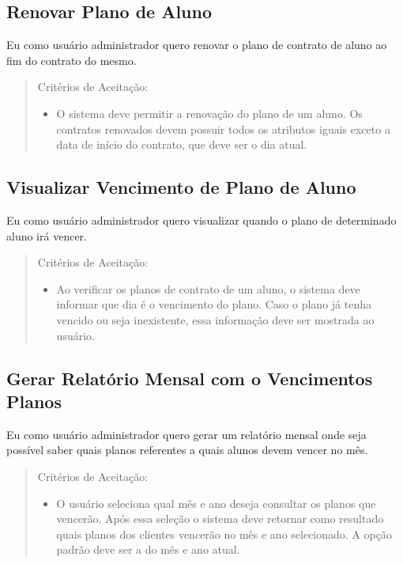 \subsection[Renovar Plano de Aluno]{Renovar Plano de Aluno}
Eu como usuário administrador quero renovar o plano de contrato de aluno ao fim do contrato do mesmo.

\begin{quote}
Critérios de Aceitação:
    \begin{itemize}
        \item O sistema deve permitir a renovação do plano de um aluno.  Os contratos renovados devem possuir todos os atributos iguais exceto a data de início do contrato, que deve ser o dia atual.
    \end{itemize}
\end{quote}

\subsection[Visualizar Vencimento de Plano de Aluno]{Visualizar Vencimento de Plano de Aluno}
Eu como usuário administrador quero visualizar quando o plano de determinado
aluno irá vencer.

\begin{quote}
Critérios de Aceitação:
    \begin{itemize}
        \item Ao verificar os planos de contrato de um aluno, o sistema deve informar que dia é o vencimento do plano. Caso o plano já tenha vencido ou seja inexistente, essa informação deve ser mostrada ao usuário.
    \end{itemize}
\end{quote}

\subsection[Gerar Relatório Mensal com o Vencimentos Planos]{Gerar Relatório Mensal com o Vencimentos Planos}
Eu como usuário administrador quero gerar um relatório mensal onde seja possível
saber quais planos referentes a quais alunos devem vencer no mês.

\begin{quote}
Critérios de Aceitação:
    \begin{itemize}
        \item O usuário seleciona qual mês e ano deseja consultar os planos que vencerão. Após essa seleção o sistema deve retornar como resultado quais planos dos clientes vencerão no mês e ano selecionado. A opção padrão deve ser a do mês e ano atual.
    \end{itemize}
\end{quote}

